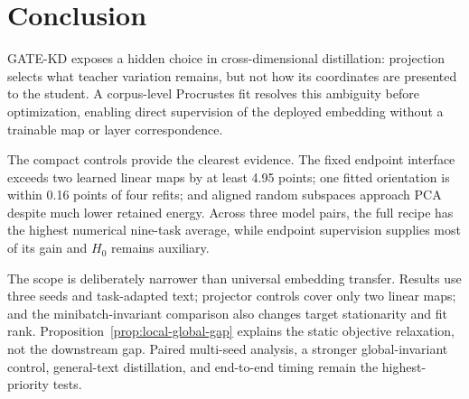 \section{Conclusion}
\label{sec:conclusion}

GATE-KD exposes a hidden choice in cross-dimensional distillation: projection
selects what teacher variation remains, but not how its coordinates are
presented to the student. A corpus-level Procrustes fit resolves this ambiguity
before optimization, enabling direct supervision of the deployed embedding
without a trainable map or layer correspondence.

The compact controls provide the clearest evidence. The fixed endpoint
interface exceeds two learned linear maps by at least 4.95 points; one fitted
orientation is within 0.16 points of four refits; and aligned random subspaces
approach PCA despite much lower retained energy. Across three model pairs, the
full recipe has the highest numerical nine-task average, while endpoint
supervision supplies most of its gain and $H_0$ remains auxiliary.

The scope is deliberately narrower than universal embedding transfer. Results
use three seeds and task-adapted text; projector controls cover only two linear
maps; and the minibatch-invariant comparison also changes target stationarity
and fit rank. Proposition~\ref{prop:local-global-gap} explains the static
objective relaxation, not the downstream gap. Paired multi-seed analysis, a
stronger global-invariant control, general-text distillation, and end-to-end
timing remain the highest-priority tests.
